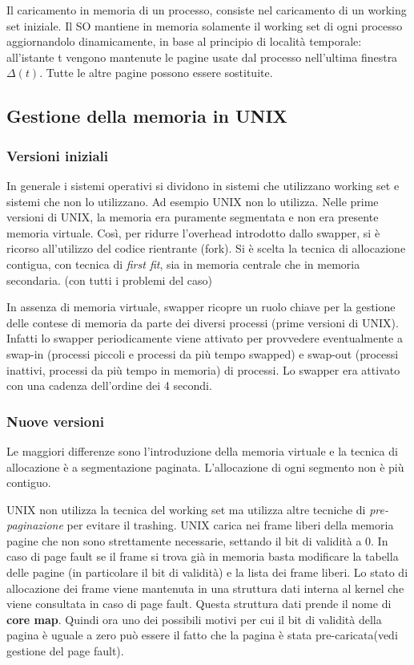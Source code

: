\documentclass{article}
\begin{document}
\noindent Il caricamento in memoria di un processo, consiste nel caricamento di un working set iniziale. Il SO mantiene in memoria solamente il working set di ogni processo
aggiornandolo dinamicamente, in base al principio di località temporale: all'istante t vengono mantenute le pagine usate dal processo nell'ultima finestra $\Delta(t)$.
Tutte le altre pagine possono essere sostituite.


\subsection{Gestione della memoria in UNIX}
\subsubsection{Versioni iniziali}

\noindent In generale i sistemi operativi si dividono in sistemi che utilizzano working set e sistemi che non lo utilizzano. Ad esempio UNIX non lo utilizza.
Nelle prime versioni di UNIX, la memoria era puramente segmentata e non era presente memoria virtuale. Così, per ridurre l'overhead introdotto dallo swapper,
si è ricorso all'utilizzo del codice rientrante (fork). Si è scelta la tecnica di allocazione contigua, con tecnica di \textit{first fit}, sia in memoria centrale 
che in memoria secondaria. (con tutti i problemi del caso)
\medskip

\noindent In assenza di memoria virtuale, swapper ricopre un ruolo chiave per la gestione delle contese di memoria da parte dei diversi processi (prime versioni di UNIX).
Infatti lo swapper periodicamente viene attivato per provvedere eventualmente a swap-in (processi piccoli e processi da più tempo swapped) e swap-out (processi inattivi,
 processi da più tempo in memoria) di processi. Lo swapper era attivato con una cadenza dell'ordine dei 4 secondi. 

\subsubsection{Nuove versioni}
\noindent Le maggiori differenze sono l'introduzione della memoria virtuale e la tecnica di allocazione è a segmentazione paginata. L'allocazione di ogni segmento non è
 più contiguo.
\medskip

\noindent UNIX non utilizza la tecnica del working set ma utilizza altre tecniche di \textit{pre-paginazione} per evitare il trashing. UNIX carica nei frame liberi della
 memoria pagine che non sono strettamente necessarie, settando il bit di validità a 0. In caso di page fault se il frame si trova già in memoria basta modificare la tabella 
 delle pagine (in particolare il bit di validità) e la lista dei frame liberi.
Lo stato di allocazione dei frame viene mantenuta in una struttura dati interna al kernel che viene consultata in caso di page fault. Questa struttura dati prende il nome
di \textbf{core map}. Quindi ora uno dei possibili motivi per cui il bit di validità della pagina è uguale a zero può essere il fatto che la pagina è stata
 pre-caricata(vedi gestione del page fault). 
\end{document}
